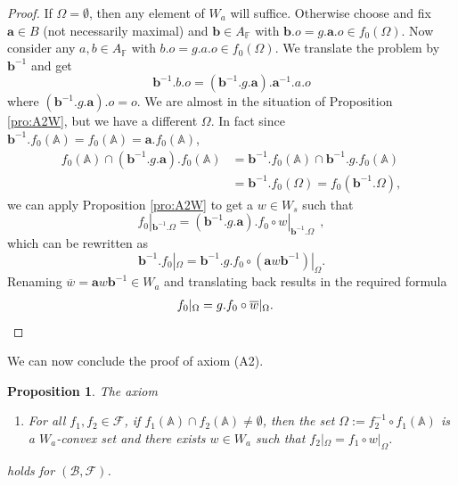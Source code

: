 \documentclass[12pt]{amsart}
\newcommand{\F}{\mathbb{F} }
\newcommand{\A}{\mathbb{A}}
\newcommand{\Fun}{\mathscr{F}} %
\newcommand{\B}{\mathcal{B}}
\numberwithin{equation}{section}
\newtheorem{proposition}[theorem]{Proposition}
\theoremstyle{remark} %
\begin{document}
\begin{proof}
	If $\Omega=\emptyset$, then any element of $W_a$ will suffice. Otherwise choose and fix $\pmb{a}\in B$ (not necessarily maximal) and $\pmb{b}\in A_\F$ with $\pmb{b}.o =g.\pmb{a}.o \in f_0(\Omega)$. Now consider any $a,b \in A_\F$ with $b.o = g.a.o \in f_0(\Omega)$. We translate the problem by $\pmb{b}^{-1}$ and get
	$$
	\pmb{b}^{-1}.b.o = (\pmb{b}^{-1}.g.\pmb{a}).\pmb{a}^{-1}.a.o
	$$
	where $(\pmb{b}^{-1}.g.\pmb{a}).o = o$. We are almost in the situation of Proposition \ref{pro:A2W}, but we have a different $\Omega$. In fact since $\pmb{b}^{-1}.f_0(\A)=f_0(\A)=\pmb{a}.f_0(\A)$,
	\begin{align*}
		f_0(\A)\cap (\pmb{b}^{-1}.g.\pmb{a}).f_0(\A) &=\pmb{b}^{-1}.f_0(\A)\cap \pmb{b}^{-1}.g.f_0(\A) \\ &=\pmb{b}^{-1}.f_0(\Omega)=f_0(\pmb{b}^{-1}.\Omega),
	\end{align*} 
	we can apply Proposition \ref{pro:A2W} to get a $w \in W_s$ such that
	$$
	f_0|_{\pmb{b}^{-1}.\Omega}= (\pmb{b}^{-1}.g.\pmb{a}).f_0 \circ w |_{\pmb{b}^{-1}.\Omega} \ \ ,
	$$
	which can be rewritten as
	$$
	\pmb{b}^{-1}.f_0|_\Omega =  \pmb{b}^{-1}.g.f_0\circ (\pmb{a} w \pmb{b}^{-1}) |_\Omega.
	$$
	Renaming $\overline{w}=\pmb{a} w \pmb{b}^{-1} \in W_a$ and translating back results in the required formula
	\begin{align*}
	f_0|_\Omega &=  g.f_0\circ \overline{w} |_\Omega. \qedhere
		\end{align*}
\end{proof}
We can now conclude the proof of axiom (A2).
\begin{proposition}\label{prop:A2_SLn}
	\label{pro:A2} The axiom
	\begin{enumerate}
		\item [(A2)] For all $f_1,f_2 \in \Fun$, if $f_1(\A)\cap f_2(\A)\neq \emptyset$, then the set $\Omega := f_2^{-1}\circ f_1(\A)$ is a $W_a$-convex set and there exists $w \in W_a$ such that $f_2|_\Omega = f_1\circ w |_\Omega$. 
	\end{enumerate}
	holds for $(\B,\Fun)$.
\end{proposition}
\end{document}
